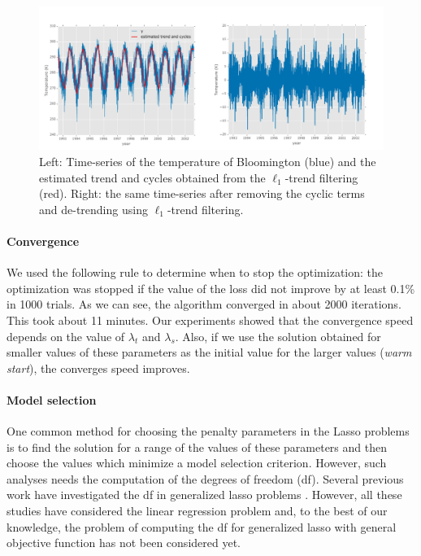 \documentclass{article}
\begin{document}
\begin{figure}[tb]
	\vskip 0.2in
	\begin{center}
		\centerline{\includegraphics[width=\columnwidth]{Figures/bloom_trend_resid}}
		\caption{Left: Time-series of the temperature of Bloomington (blue) and the estimated trend and cycles obtained from the $\ell_1$-trend filtering (red). Right: the same time-series after removing the cyclic terms and de-trending using $\ell_1$-trend filtering.}
		\label{fig:bloom_detrended}
	\end{center}
	\vskip -0.2in
\end{figure} 


\paragraph{Convergence}

We used the following rule to determine when to stop the optimization: the optimization was stopped if the value of the loss did not improve by at least 0.1\% in 1000 trials. As we can see, the algorithm converged in about 2000 iterations. This took about 11 minutes. Our experiments showed that the convergence speed depends on the value of $\lambda_t$ and $\lambda_s$. Also, if we use the solution obtained for smaller values of these parameters as the initial value for the larger values (\textit{warm start}), the converges speed improves.


\paragraph{Model selection}
One common method for choosing the penalty parameters in the Lasso problems is to find the solution for a range of the values of these parameters and then choose the values which minimize a model selection criterion. However, such analyses needs the computation of the degrees of freedom (df). Several previous work have investigated the df in generalized lasso problems \citep{tibshirani_degrees_2012,hu_dual_2015,zeng_geometry_2017}. However, all these studies have considered the linear regression problem and, to the best of our knowledge, the problem of computing the df for generalized lasso with general objective function has not been considered yet.
\end{document}
